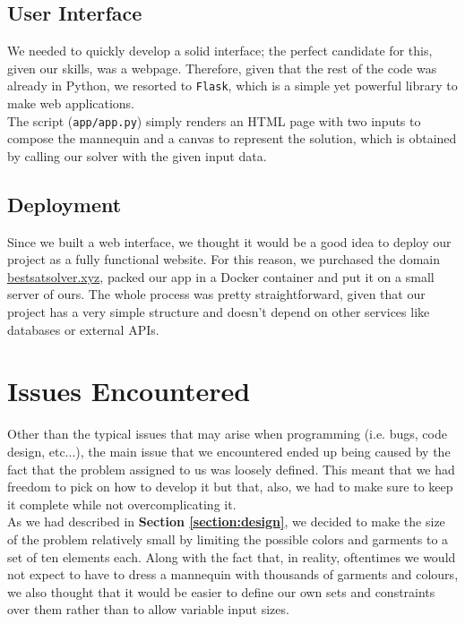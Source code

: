 \documentclass[12pt]{article}
\begin{document}
    \subsection{User Interface}
        We needed to quickly develop a solid interface; the perfect candidate for this, given our skills, was a webpage. Therefore, given that the rest of the code
        was already in Python, we resorted to \texttt{Flask}, which is a simple yet powerful library to make web applications.\\
        The script (\texttt{app/app.py}) simply renders an HTML page with two inputs to compose the mannequin and a canvas to represent the solution, which is obtained by 
        calling our solver with the given input data.


    \subsection{Deployment}
        Since we built a web interface, we thought it would be a good idea to deploy our project as a fully functional website. 
        For this reason, we purchased the domain \url{bestsatsolver.xyz}, packed our app in a Docker container and put it on a small server of ours.
        The whole process was pretty straightforward, given that our project has a very simple structure and doesn't depend on other services like databases or external APIs.

\section{Issues Encountered}
\label{section:issues}

Other than the typical issues that may arise when programming (i.e. bugs, code design, etc...), the main issue that we encountered ended up being caused by the fact that the problem assigned to us was loosely defined. This meant that we had freedom to pick on how to develop it but that, also, we had to make sure to keep it complete while not overcomplicating it.\\

As we had described in \textbf{Section \ref{section:design}}, we decided to make the size of the problem relatively small by limiting the possible colors and garments to a set of ten elements each. Along with the fact that, in reality, oftentimes we would not expect to have to dress a mannequin with thousands of garments and colours, we also thought that it would be easier to define our own sets and constraints over them rather than to allow variable input sizes.\\
\end{document}
